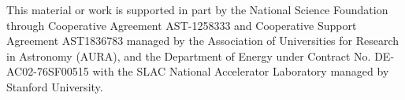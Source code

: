 \documentclass[11pt,twoside]{article}
\begin{document}
\acknowledgements This material or work is supported in part by the National Science Foundation through Cooperative Agreement AST-1258333 and Cooperative Support Agreement AST1836783 managed by the Association of Universities for Research in Astronomy (AURA), and the Department of Energy under Contract No. DE-AC02-76SF00515 with the SLAC National Accelerator Laboratory managed by Stanford University.



\end{document}
